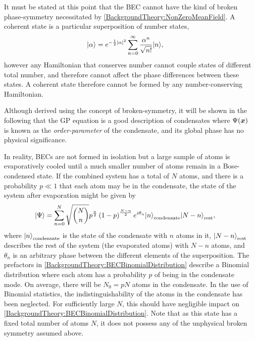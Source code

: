 It must be stated at this point that the BEC cannot have the kind of broken phase-symmetry necessitated by \eqref{BackgroundTheory:NonZeroMeanField}.  A coherent state is a particular superposition of number states,
\begin{align}
    {\ensuremath{\left|\alpha\right>}} &= e^{-\frac{1}{2} \left|\alpha\right|^2} \sum_{n=0}^{\infty} \frac{\alpha^n}{\sqrt{n!}} {\left|n\right>},
\end{align}
however any Hamiltonian that conserves number cannot couple states of different total number, and therefore cannot affect the phase differences between these states.  A coherent state therefore cannot be formed by any number-conserving Hamiltonian.

Although derived using the concept of broken-symmetry, it will be shown in the following that the GP equation is a good description of condensates where $\Psi(\bm{x})$ is known as the \emph{order-parameter} of the condensate, and its global phase has no physical significance.

In reality, BECs are not formed in isolation but a large sample of atoms is evaporatively cooled until a much smaller number of atoms remain in a Bose-condensed state.  If the combined system has a total of $N$ atoms, and there is a probability $p \ll 1$ that each atom may be in the condensate, the state of the system after evaporation might be given by
\begin{align}
    \ket{\Psi} &= \sum_{n=0}^N \sqrt{N \choose n}   p^{\frac{n}{2}} \left(1-p\right)^{\frac{N-n}{2}}  e^{i \theta_n} \ket{n}_\text{condensate}\ket{N-n}_\text{rest}, \label{BackgroundTheory:BECBinomialDistribution}
\end{align}
where ${\left|n\right>}_\text{condensate}$ is the state of the condensate with $n$ atoms in it, ${\left|N-n\right>}_\text{rest}$ describes the rest of the system (the evaporated atoms) with $N-n$ atoms, and $\theta_n$ is an arbitrary phase between the different elements of the superposition.  The prefactors in \eqref{BackgroundTheory:BECBinomialDistribution} describe a Binomial distribution where each atom has a probability $p$ of being in the condensate mode.  On average, there will be $N_0 = p N$ atoms in the condensate.  In the use of Binomial statistics, the indistinguishability of the atoms in the condensate has been neglected.  For sufficiently large $N$, this should have negligible impact on \eqref{BackgroundTheory:BECBinomialDistribution}.  Note that as this state has a fixed total number of atoms $N$, it does not possess any of the unphysical broken symmetry assumed above.

